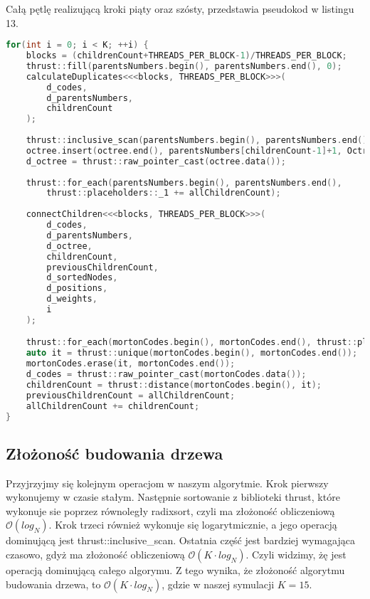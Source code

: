 \documentclass[14pt,twoside,a4paper]{article}
\theoremstyle{definition}
\begin{document}
Całą pętlę realizującą kroki piąty oraz szósty, przedstawia pseudokod w listingu 13.
\begin{lstlisting}[language=C++, frame=single, framerule=2pt, caption=Kroki 4-5]
for(int i = 0; i < K; ++i) {
    blocks = (childrenCount+THREADS_PER_BLOCK-1)/THREADS_PER_BLOCK;
    thrust::fill(parentsNumbers.begin(), parentsNumbers.end(), 0);
    calculateDuplicates<<<blocks, THREADS_PER_BLOCK>>>(
        d_codes,
        d_parentsNumbers,
        childrenCount
    );
        
    thrust::inclusive_scan(parentsNumbers.begin(), parentsNumbers.end(), parentsNumbers.begin());
    octree.insert(octree.end(), parentsNumbers[childrenCount-1]+1, OctreeNode());
    d_octree = thrust::raw_pointer_cast(octree.data());
        
    thrust::for_each(parentsNumbers.begin(), parentsNumbers.end(),
    	thrust::placeholders::_1 += allChildrenCount);
        
    connectChildren<<<blocks, THREADS_PER_BLOCK>>>(
        d_codes,
        d_parentsNumbers,
        d_octree,
        childrenCount,
        previousChildrenCount,
        d_sortedNodes,
        d_positions,
        d_weights,
        i
    );

    thrust::for_each(mortonCodes.begin(), mortonCodes.end(), thrust::placeholders::_1 >>= 3);        
    auto it = thrust::unique(mortonCodes.begin(), mortonCodes.end());
    mortonCodes.erase(it, mortonCodes.end());
    d_codes = thrust::raw_pointer_cast(mortonCodes.data()); 
    childrenCount = thrust::distance(mortonCodes.begin(), it);
    previousChildrenCount = allChildrenCount;
    allChildrenCount += childrenCount;
}
\end{lstlisting}
\subsection{\Large Złożoność budowania drzewa}
Przyjrzyjmy się kolejnym operacjom w naszym algorytmie. Krok pierwszy wykonujemy w czasie stałym. Następnie sortowanie z biblioteki thrust, które wykonuje sie poprzez równoległy radixsort, czyli ma złożoność obliczeniową $\mathcal{O}(log_{N})$. Krok trzeci również wykonuje się logarytmicznie, a jego operacją dominującą jest thrust::inclusive\_scan. Ostatnia część jest bardziej wymagająca czasowo, gdyż ma złożoność obliczeniową $\mathcal{O}(K\cdot log_{N})$.
Czyli widzimy, żę jest operacją dominującą całego algorymu. Z tego wynika, że złożoność algorytmu budowania drzewa, to $\mathcal{O}(K\cdot log_{N})$, gdzie w naszej symulacji $K=15$.
\end{document}
